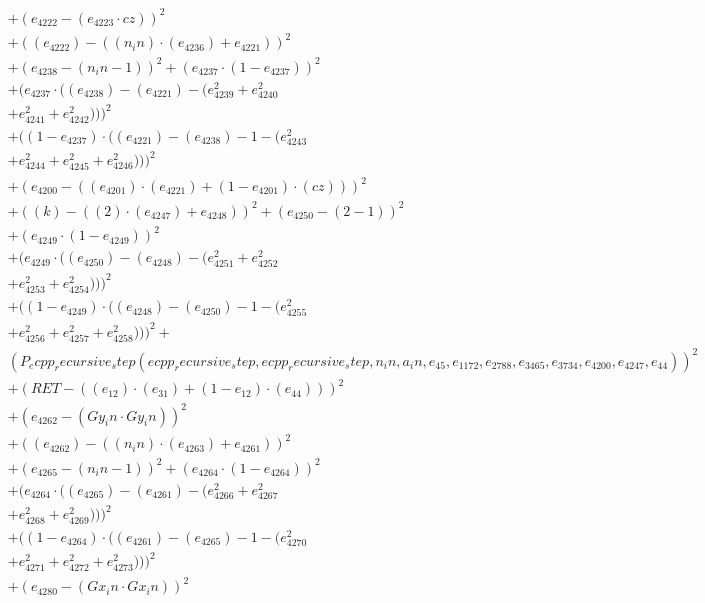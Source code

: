 \documentclass[10pt, a4paper]{article}
\begin{document}
\begin{align*}
& + (e_{4222} - (e_{4223}  \cdot  cz))^{2} \\
& + ((e_{4222}) - ((n_in)  \cdot  (e_{4236}) + e_{4221}))^{2} \\
& + (e_{4238} - (n_in - 1))^{2} + (e_{4237}  \cdot  (1 - e_{4237}))^{2} \\
& + (e_{4237}  \cdot  ((e_{4238}) - (e_{4221}) - (e_{4239}^{2} + e_{4240}^{2} \\
& + e_{4241}^{2} + e_{4242}^{2})))^{2} \\
& + ((1 - e_{4237})  \cdot  ((e_{4221}) - (e_{4238}) - 1 - (e_{4243}^{2} \\
& + e_{4244}^{2} + e_{4245}^{2} + e_{4246}^{2})))^{2} \\
& + (e_{4200} - ((e_{4201})  \cdot  (e_{4221}) + (1 - e_{4201})  \cdot  (cz)))^{2} \\
& + ((k) - ((2)  \cdot  (e_{4247}) + e_{4248}))^{2} + (e_{4250} - (2 - 1))^{2} \\
& + (e_{4249}  \cdot  (1 - e_{4249}))^{2} \\
& + (e_{4249}  \cdot  ((e_{4250}) - (e_{4248}) - (e_{4251}^{2} + e_{4252}^{2} \\
& + e_{4253}^{2} + e_{4254}^{2})))^{2} \\
& + ((1 - e_{4249})  \cdot  ((e_{4248}) - (e_{4250}) - 1 - (e_{4255}^{2} \\
& + e_{4256}^{2} + e_{4257}^{2} + e_{4258}^{2})))^{2} + \\
& (P_ecpp_recursive_step(ecpp_recursive_step, ecpp_recursive_step, n_in, a_in, e_{45}, e_{1172}, e_{2788}, e_{3465}, e_{3734}, e_{4200}, e_{4247}, e_{44}))^{2} \\
& + (RET - ((e_{12})  \cdot  (e_{31}) + (1 - e_{12})  \cdot  (e_{44})))^{2} \\
& + (e_{4262} - (Gy_in  \cdot  Gy_in))^{2} \\
& + ((e_{4262}) - ((n_in)  \cdot  (e_{4263}) + e_{4261}))^{2} \\
& + (e_{4265} - (n_in - 1))^{2} + (e_{4264}  \cdot  (1 - e_{4264}))^{2} \\
& + (e_{4264}  \cdot  ((e_{4265}) - (e_{4261}) - (e_{4266}^{2} + e_{4267}^{2} \\
& + e_{4268}^{2} + e_{4269}^{2})))^{2} \\
& + ((1 - e_{4264})  \cdot  ((e_{4261}) - (e_{4265}) - 1 - (e_{4270}^{2} \\
& + e_{4271}^{2} + e_{4272}^{2} + e_{4273}^{2})))^{2} \\
& + (e_{4280} - (Gx_in  \cdot  Gx_in))^{2} \\

\end{align*}
\end{document}
